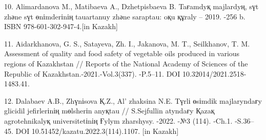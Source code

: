\begin{references}
10. Alimardanova M., Matibaeva A., Dzhetpisbaeva B. Taғamdyқ majlardyң,
sүt zhәne sүt өnіmderіnің tauartanuy zhәne saraptau: oқu құraly -- 2019.
-256 b. ISBN 978-601-302-947-4.{[}in Kazakh{]}

11. Aidarkhanova, G. S., Satayeva, Zh. I., Jakanova, M. T., Seilkhanov,
T. M. Assessment of quality and food safety of vegetable oils produced
in various regions of Kazakhstan // Reports of the National Academy of
Sciences of the Republic of Kazakhstan.-2021.-Vol.3(337). -P.5--11. DOI
10.32014/2021.2518-1483.41.

12. Dalabaev A.B., Zhүnіsova Қ.Z., Al' zhaksina N.E. Tүrlі
өsіmdіk majlaryndaғy glicidil jefirlerіnің mөlsherіn anyқtau //
S.Sejfullin atyndaғy Қazaқ agrotehnikalyқ universitetіnің Ғylym
zharshysy. -2022. -№3 (114). -Ch.1. -S.36--45. DOI
10.51452/kazatu.2022.3(114).1107. {[}in Kazakh{]}
\end{references}


